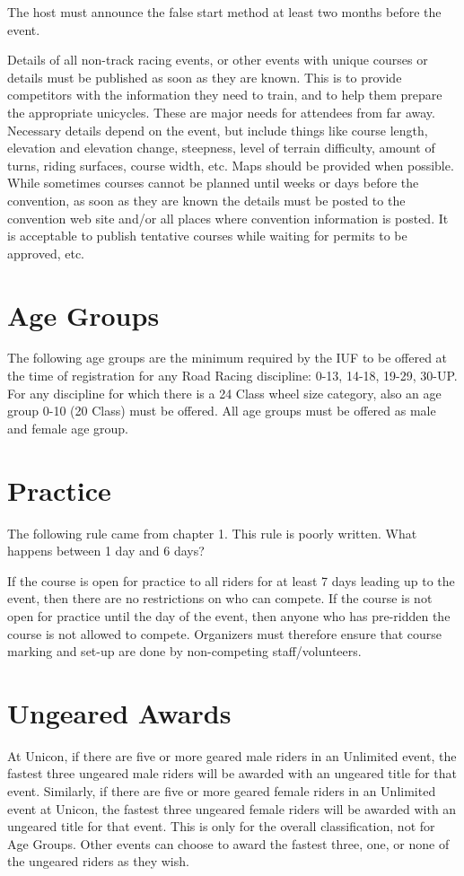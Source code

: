 The host must announce the false start method at least two months before the event.

Details of all non-track racing events, or other events with unique courses or details must be published as soon as they are known.
This is to provide competitors with the information they need to train, and to help them prepare the appropriate unicycles.
These are major needs for attendees from far away.
Necessary details depend on the event, but include things like course length, elevation and elevation change, steepness, level of terrain difficulty, amount of turns, riding surfaces, course width, etc.
Maps should be provided when possible.
While sometimes courses cannot be planned until weeks or days before the convention, as soon as they are known the details must be posted to the convention web site and/or all places where convention information is posted.
It is acceptable to publish tentative courses while waiting for permits to be approved, etc.

\section{Age Groups}

The following age groups are the minimum required by the IUF to be offered at the time of registration for any Road Racing discipline: 0-13, 14-18, 19-29, 30-UP.
For any discipline for which there is a 24 Class wheel size category, also an age group 0-10 (20 Class) must be offered.
All age groups must be offered as male and female age group.

\section{Practice}

\begin{comment2016}
The following rule came from chapter 1.
This rule is poorly written.
What happens between 1 day and 6 days?
\end{comment2016}

If the course is open for practice to all riders for at least 7 days leading up to the event, then there are no restrictions on who can compete.
If the course is not open for practice until the day of the event, then anyone who has pre-ridden the course is not allowed to compete.
Organizers must therefore ensure that course marking and set-up are done by non-competing staff/volunteers.

\section{Ungeared Awards}
At Unicon, if there are five or more geared male riders in an Unlimited event, the fastest three ungeared male riders will be awarded with an ungeared title for that event.
Similarly, if there are five or more geared female riders in an Unlimited event at Unicon, the fastest three ungeared female riders will be awarded with an ungeared title for that event.
This is only for the overall classification, not for Age Groups.
Other events can choose to award the fastest three, one, or none of the ungeared riders as they wish.

